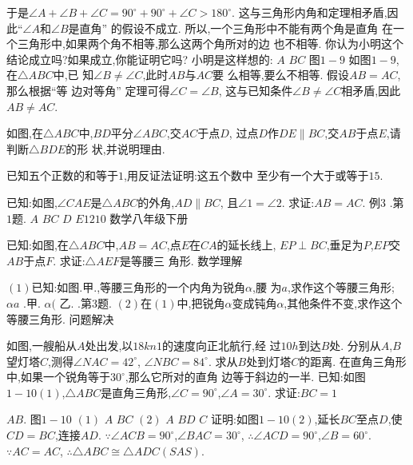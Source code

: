 \documentclass[cn,blue,12pt]{elegantbook}
\begin{document}
\begin{liti}[resume]
于是\( \angle A + \angle B + \angle C = 90 ^\circ + 90 ^\circ + \angle C > 180 ^\circ \). 
这与三角形内角和定理相矛盾,因此``\( \angle A \)和\( \angle B \)是直角'' 的假设不成立. 
所以,一个三角形中不能有两个角是直角
在一个三角形中,如果两个角不相等,那么这两个角所对的边
也不相等. 你认为小明这个结论成立吗?如果成立,你能证明它吗?
小明是这样想的:
\(A\)
\(B C\)
图\( 1-9\)
如图\( 1-9\),在\( \triangle ABC \)中,已
知\( \angle B \ne \angle  C\),此时\( AB \)与\( AC \)要
么相等,要么不相等. 
假设\( AB = AC\),那么根据``等
边对等角'' 定理可得\( \angle C = \angle B\),
这与已知条件\( \angle B \ne \angle C \)相矛盾,因此\( AB \ne AC\). 
\item 如图,在\( \triangle ABC \)中,\( BD \)平分\( \angle ABC\),交\( AC \)于点\( D\),
过点\( D \)作\( DE \parallel BC\),交\( AB \)于点\( E\),请判断\( \triangle BDE \)的形
状,并说明理由. 
\item 已知五个正数的和等于\( 1\),用反证法证明:这五个数中
至少有一个大于或等于\( 1 5 \). 
\item 已知:如图,\( \angle  CAE \)是\( \triangle ABC \)的外角,\( AD \parallel BC\),
且\(  \angle  1 =  \angle  2\). 
求证:\( AB = AC\). 
例\(3\)
.第\( 1 \)题.
\(A\)
\(B C\)
\(D\)
\(E 1210\)
数学\(  \)八年级\(  \)下册
\item 已知:如图,在\( \triangle ABC \)中,\( AB = AC\),点\( E \)在\( CA \)的延长线上,
\(EP \perp BC\),垂足为\( P\),\( EP \)交\( AB \)于点\( F\). 求证:\( \triangle AEF \)是等腰三
角形. 
数学理解
\item \( ( 1) \)已知:如图.甲.,等腰三角形的一个内角为锐角\( \alpha \),腰
为\( a\),求作这个等腰三角形;
\( \alpha a\)
.甲.
\( \alpha (\)
乙.
.第\( 3 \)题.
\(( 2) \)在\(( 1) \)中,把锐角\( \alpha  \)变成钝角\( \alpha \),其他条件不变,求作这个等腰三角形. 
问题解决
\item 如图,一艘船从\( A \)处出发,以\( 18 kn1 \)的速度向正北航行,经
过\( 10 h \)到达\( B \)处. 分别从\( A\),\( B \)望灯塔\( C\),测得\( \angle NAC = 42 ^\circ \),
\( \angle NBC = 84 ^\circ \). 求从\( B \)处到灯塔\( C \)的距离. 
在直角三角形中,如果一个锐角等于\(30 ^\circ \),那么它所对的直角
边等于斜边的一半. 
已知:如图\( 1-10( 1)\),\( \triangle ABC \)是直角三角形,\( \angle  C = 90 ^\circ \),\( \angle  A = 30 ^\circ \). 
求证:\( BC = 1\)
\item \( AB\). 
图\( 1-10\)
\(( 1)\)
\(A\)
\(B C\)
\(( 2)\)
\(A\)
\(B D\)
\(C\)
证明:如图\( 1-10( 2)\),延长\( BC \)至点\( D\),使\( CD = BC\),连接\( AD\). 
\( \because \angle ACB = 90 ^\circ \),\( \angle BAC = 30 ^\circ \),
\( \therefore \angle ACD = 90 ^\circ \),\( \angle B = 60 ^\circ \). 
\( \because AC = AC\),
\( \therefore \triangle ABC \cong  \triangle ADC( SAS) \). 

\end{liti}
\end{document}
